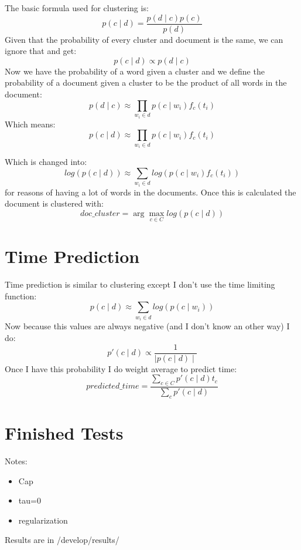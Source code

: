 \documentclass[11pt,a4paper]{article}
\begin{document}
The basic formula used for clustering is:
\begin{equation}
  p(c \mid d) = \frac{p(d \mid c) p(c)}{p(d)}
\end{equation}
Given that the probability of every cluster and document is the same, we can ignore that and get:
\begin{equation}
  p(c \mid d) \propto p(d \mid c)
\end{equation}
Now we have the probability of a word given a cluster and we define the probability of a document given a cluster to be the product of all words in the document:
\begin{equation}
  p(d \mid c) \approx \prod_{w_i \in d}{p(c \mid w_i) f_c(t_i)}
\end{equation}
Which means:
\begin{equation}
	p(c \mid d) \approx \prod_{w_i \in d}{p(c \mid w_i) f_c(t_i)}
\end{equation}

Which is changed into:
\begin{equation}
  log(p(c \mid d)) \approx \sum_{w_i \in d}{log(p(c \mid w_i) f_c(t_i))}
\end{equation}
for reasons of having a lot of words in the documents. Once this is calculated the document is clustered with:
\begin{equation}
  doc\_cluster = \arg\max_{c \in C} log(p(c \mid d))
\end{equation}

\section{Time Prediction}
Time prediction is similar to clustering except I don't use the time limiting function:
\begin{equation}
	p(c \mid d) \approx \sum_{w_i \in d}{log(p(c \mid w_i))}
\end{equation}
Now because this values are always negative (and I don't know an other way) I do:
\begin{equation}
	p'(c \mid d) \propto \frac{1}{\mid p(c \mid d) \mid}
\end{equation}
Once I have this probability I do weight average to predict time:
\begin{equation}
	predicted\_time = \frac{\sum_{c \in C}{p'(c \mid d)t_c}}{\sum_c{p'(c \mid d)}}
\end{equation}

\section{Finished Tests}
Notes:
\begin{itemize}
  \item Cap
  \item tau=0
  \item regularization
\end{itemize}
Results are in /develop/results/
\end{document}
